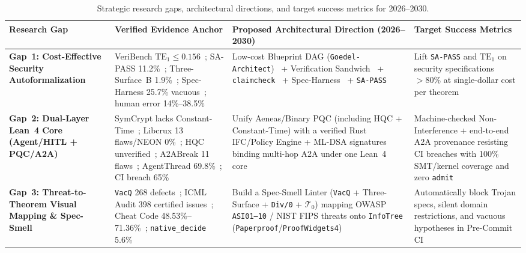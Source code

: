 \documentclass[10pt,twocolumn]{article}
\begin{document}
\begin{table}[tp]
  \centering
  \scriptsize
  \caption{Strategic research gaps, architectural directions, and target success metrics for 2026--2030.}
  \label{tab:gaps}
  \begin{tabularx}{\textwidth}{L{3.1cm} L{4.2cm} Y L{3.6cm}}
    \toprule
    \textbf{Research Gap} & \textbf{Verified Evidence Anchor} & \textbf{Proposed Architectural Direction (2026--2030)} & \textbf{Target Success Metrics} \\
    \midrule
    \textbf{Gap~1: Cost-Effective Security Autoformalization} & VeriBench $\mathrm{TE}_1 \le 0.156$~\cite{miranda2026veribench}; SA-PASS 11.2\%~\cite{han2026shadowbench}; Three-Surface~B 1.9\%~\cite{threesurface2026}; Spec-Harness 25.7\% vacuous~\cite{misu2026specharness}; human error 14\%--38.5\%~\cite{firsching2026formalconjectures,chen2026reform} & Low-cost Blueprint DAG (\texttt{Goedel-Architect})~\cite{chung2026goedelarchitect} + Verification Sandwich~\cite{mondl2026policyascode} + \texttt{claimcheck}~\cite{amster2026claimcheck} + Spec-Harness~\cite{misu2026specharness} + \texttt{SA-PASS}~\cite{han2026shadowbench} & Lift \texttt{SA-PASS} and $\mathrm{TE}_1$ on security specifications $>80\%$ at single-dollar cost per theorem \\
    \textbf{Gap~2: Dual-Layer Lean~4 Core (Agent/HITL + PQC/A2A)} & SymCrypt lacks Constant-Time~\cite{ho2026symcrypt}; Libcrux 13 flaws/NEON 0\%~\cite{kobeissi2026theatre}; HQC unverified~\cite{alagic2025nistir8545}; A2ABreak 11 flaws~\cite{lotfi2026a2abreak}; AgentThread 69.8\%~\cite{agentthread2026}; CI breach 65\%~\cite{abdelnabi2026ci} & Unify Aeneas/Binary PQC (including HQC + Constant-Time) with a verified Rust IFC/Policy Engine + ML-DSA signatures binding multi-hop A2A under one Lean~4 core~\cite{ho2026symcrypt,chaudhuri2026alphaproofcode,wang2026lean4agent} & Machine-checked Non-Interference + end-to-end A2A provenance resisting CI breaches with 100\% SMT/kernel coverage and zero \texttt{admit} \\
    \textbf{Gap~3: Threat-to-Theorem Visual Mapping \& Spec-Smell} & \texttt{VacQ} 268 defects~\cite{mei2026beyondllm}; ICML Audit 398 certified issues~\cite{ammanamanchi2026faults}; Cheat Code 48.53\%--71.36\%~\cite{ye2026verina}; \texttt{native\_decide} 5.6\%~\cite{yang2026proofgate} & Build a Spec-Smell Linter (\texttt{VacQ} + Three-Surface + \texttt{Div/0} + $\mathcal{T}_0$) mapping OWASP \texttt{ASI01--10} / NIST FIPS threats onto \texttt{InfoTree} (\texttt{Paperproof}/\texttt{ProofWidgets4})~\cite{nawrocki2023proofwidgets4,kripner2025leantree} & Automatically block Trojan specs, silent domain restrictions, and vacuous hypotheses in Pre-Commit CI \\
    \bottomrule
  \end{tabularx}
\end{table}
\end{document}
